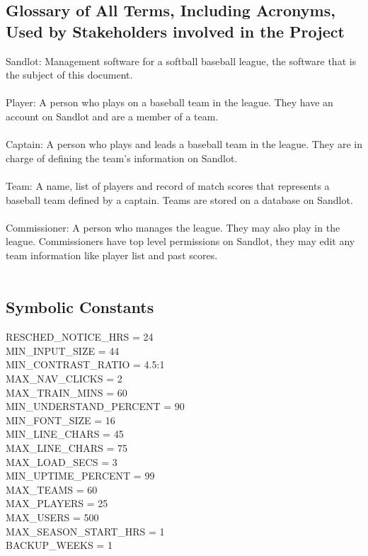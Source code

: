 \documentclass[12pt]{article}
\begin{document}
\subsection{Glossary of All Terms, Including Acronyms, Used by Stakeholders
involved in the Project}
Sandlot: Management software for a softball baseball league, the software that
is the subject of this document.\\\\
Player: A person who plays on a baseball team in the league. They have an
account on Sandlot and are a member of a team.\\\\
Captain: A person who plays and leads a baseball team in the league. They are
in charge of defining the team's information on Sandlot.\\\\
Team: A name, list of players and record of match scores that represents a
baseball team defined by a captain. Teams are stored on a database on Sandlot.
\\\\
Commissioner: A person who manages the league. They may also play in the
league. Commissioners have top level permissions on Sandlot, they may edit any
team information like player list and past scores.\\\\

\subsection{Symbolic Constants}
RESCHED\_NOTICE\_HRS = 24\\
MIN\_INPUT\_SIZE = 44\\
MIN\_CONTRAST\_RATIO = 4.5:1\\
MAX\_NAV\_CLICKS = 2\\
MAX\_TRAIN\_MINS = 60\\
MIN\_UNDERSTAND\_PERCENT = 90\\
MIN\_FONT\_SIZE = 16\\
MIN\_LINE\_CHARS = 45\\
MAX\_LINE\_CHARS = 75\\
MAX\_LOAD\_SECS = 3\\
MIN\_UPTIME\_PERCENT = 99\\
MAX\_TEAMS = 60\\
MAX\_PLAYERS = 25\\
MAX\_USERS = 500\\
MAX\_SEASON\_START\_HRS = 1\\
BACKUP\_WEEKS = 1\\
\end{document}
